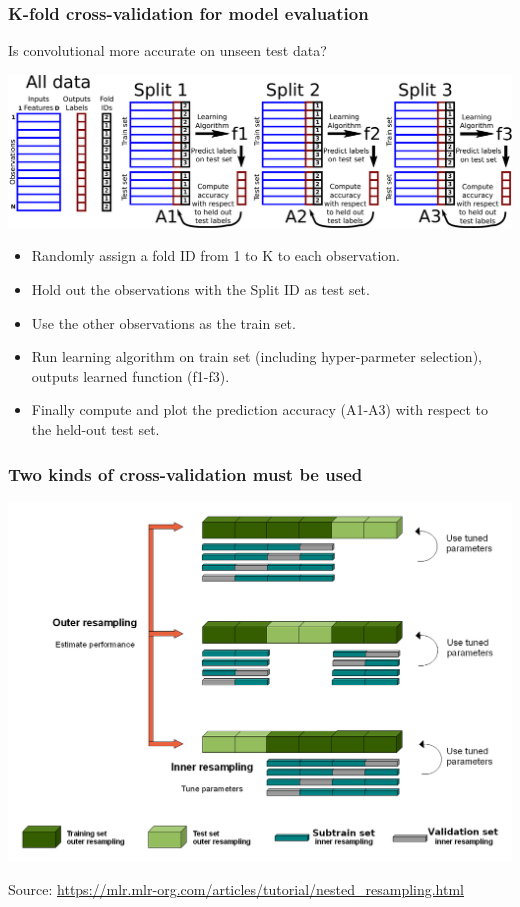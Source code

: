 \documentclass{beamer}
\begin{document}
\begin{frame}
  \frametitle{K-fold cross-validation for model evaluation}
  Is convolutional more accurate on unseen test data?
  
  \includegraphics[width=\textwidth]{drawing-cross-validation}
  
  \begin{itemize}
  \item Randomly assign a fold ID from 1 to K to each observation.
  \item Hold out the observations with the Split ID as test set.
  \item Use the other observations as the train set.
  \item Run learning algorithm on train set (including hyper-parmeter
    selection), outputs learned function (f1-f3).
  \item Finally compute and plot the prediction accuracy (A1-A3) with
    respect to the held-out test set.
  \end{itemize}
\end{frame}


 

\begin{frame}
  \frametitle{Two kinds of cross-validation must be used}
  
  \includegraphics[width=\textwidth]{nested_resampling.png}

  Source: \url{https://mlr.mlr-org.com/articles/tutorial/nested_resampling.html}
\end{frame}
\end{document}
